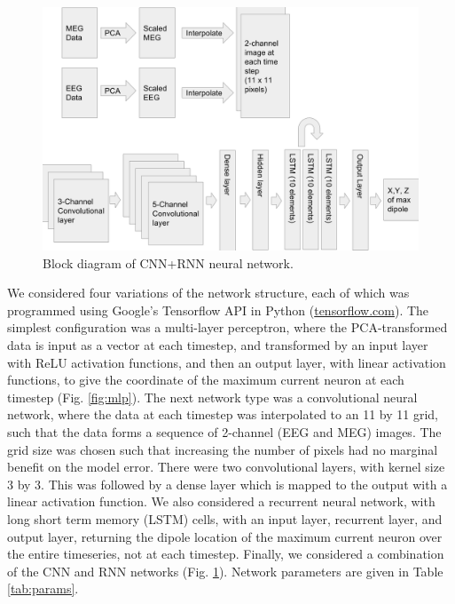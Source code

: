\documentclass[journal]{IEEEtran}
\begin{document}

\begin{figure}[h!]
\centering
\includegraphics[width=5in]{cnnrnn}
\caption{Block diagram of CNN+RNN neural network.}
\label{fig:cnnrnn}
\end{figure}


We considered four variations of the network structure, each of which was programmed using Google's Tensorflow API in Python (\url{tensorflow.com}). The simplest configuration was a multi-layer perceptron, where the PCA-transformed data is input as a vector at each timestep, and transformed by an input layer with ReLU activation functions, and then an output layer, with linear activation functions, to give the coordinate of the maximum current neuron at each timestep (Fig. \ref{fig:mlp}). The next network type was a convolutional neural network, where the data at each timestep was interpolated to an 11 by 11 grid, such that the data forms a sequence of 2-channel (EEG and MEG) images. The grid size was chosen such that increasing the number of pixels had no marginal benefit on the model error. There were two convolutional layers, with kernel size 3 by 3. This was followed by a dense layer which is mapped to the output with a linear activation function. We also considered a recurrent neural network, with long short term memory (LSTM) cells, with an input layer, recurrent layer, and output layer, returning the dipole location of the maximum current neuron over the entire timeseries, not at each timestep. Finally, we considered a combination of the CNN and RNN networks (Fig. \ref{fig:cnnrnn}). Network parameters are given in Table \ref{tab:params}. 
\end{document}
